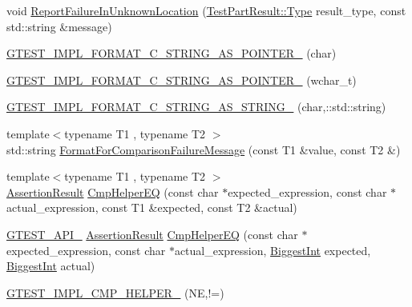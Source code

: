\begin{DoxyCompactItemize}
void \hyperlink{namespacetesting_1_1internal_a85f6ff0e40f9a5f10af66a73cf1364fa}{Report\+Failure\+In\+Unknown\+Location} (\hyperlink{classtesting_1_1_test_part_result_a65ae656b33fdfdfffaf34858778a52d5}{Test\+Part\+Result\+::\+Type} result\+\_\+type, const std\+::string \&message)
\item 
\hyperlink{namespacetesting_1_1internal_a3682f962ae0ec1c0eca6444ca0a09e91}{G\+T\+E\+S\+T\+\_\+\+I\+M\+P\+L\+\_\+\+F\+O\+R\+M\+A\+T\+\_\+\+C\+\_\+\+S\+T\+R\+I\+N\+G\+\_\+\+A\+S\+\_\+\+P\+O\+I\+N\+T\+E\+R\+\_\+} (char)
\item 
\hyperlink{namespacetesting_1_1internal_a85e08f00d443221e529a0a85a90fbaeb}{G\+T\+E\+S\+T\+\_\+\+I\+M\+P\+L\+\_\+\+F\+O\+R\+M\+A\+T\+\_\+\+C\+\_\+\+S\+T\+R\+I\+N\+G\+\_\+\+A\+S\+\_\+\+P\+O\+I\+N\+T\+E\+R\+\_\+} (wchar\+\_\+t)
\item 
\hyperlink{namespacetesting_1_1internal_a9dceb71a64d780beb2db1ed5bf24ad3f}{G\+T\+E\+S\+T\+\_\+\+I\+M\+P\+L\+\_\+\+F\+O\+R\+M\+A\+T\+\_\+\+C\+\_\+\+S\+T\+R\+I\+N\+G\+\_\+\+A\+S\+\_\+\+S\+T\+R\+I\+N\+G\+\_\+} (char,\+::std\+::string)
\item 
{\footnotesize template$<$typename T1 , typename T2 $>$ }\\std\+::string \hyperlink{namespacetesting_1_1internal_a91ab078f10adc669f09b7f604975c518}{Format\+For\+Comparison\+Failure\+Message} (const T1 \&value, const T2 \&)
\item 
{\footnotesize template$<$typename T1 , typename T2 $>$ }\\\hyperlink{classtesting_1_1_assertion_result}{Assertion\+Result} \hyperlink{namespacetesting_1_1internal_a36f7c44fad92225cbb45fde1642cf30e}{Cmp\+Helper\+E\+Q} (const char $\ast$expected\+\_\+expression, const char $\ast$actual\+\_\+expression, const T1 \&expected, const T2 \&actual)
\item 
\hyperlink{gtest-port_8h_aa73be6f0ba4a7456180a94904ce17790}{G\+T\+E\+S\+T\+\_\+\+A\+P\+I\+\_\+} \hyperlink{classtesting_1_1_assertion_result}{Assertion\+Result} \hyperlink{namespacetesting_1_1internal_ae82c79cea2973bbbfbd0f2aca7a6f349}{Cmp\+Helper\+E\+Q} (const char $\ast$expected\+\_\+expression, const char $\ast$actual\+\_\+expression, \hyperlink{namespacetesting_1_1internal_a05c6bd9ede5ccdf25191a590d610dcc6}{Biggest\+Int} expected, \hyperlink{namespacetesting_1_1internal_a05c6bd9ede5ccdf25191a590d610dcc6}{Biggest\+Int} actual)
\item 
\hyperlink{namespacetesting_1_1internal_aa3a0659f0e495c276d69bc9beddb268a}{G\+T\+E\+S\+T\+\_\+\+I\+M\+P\+L\+\_\+\+C\+M\+P\+\_\+\+H\+E\+L\+P\+E\+R\+\_\+} (N\+E,!=)

\end{DoxyCompactItemize}
